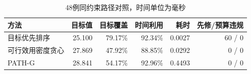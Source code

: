 \begin{table}[htbp]\centering\caption{48例同约束路径对照，时间单位为毫秒}\begin{tabularx}{\linewidth}{Yrrrrr}\toprule 方法&目标值&目标覆盖&时间利用&耗时&先修/预算违规\\\midrule
目标优先排序&25.100&79.17\%&92.34\%&0.0027&60 / 0\\
可行效用密度贪心&27.869&47.92\%&88.85\%&0.0292&0 / 0\\
PATH-G&28.841&54.17\%&92.96\%&0.4493&0 / 0\\
\bottomrule\end{tabularx}\end{table}